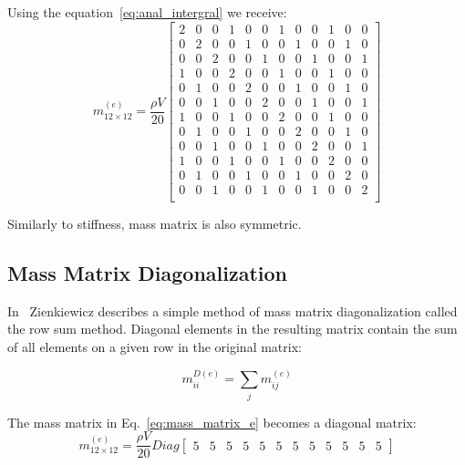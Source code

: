 \documentclass[en]{minipw} %
\begin{document}
Using the equation~\ref{eq:anal_intergral} we receive:
\begin{equation}
\label{eq:mass_matrix_e}
m^{(e)}_{12 \times 12} = \dfrac{\rho V}{20}
\begin{bmatrix}
2 & 0 & 0 & 1 & 0 & 0 & 1 & 0 & 0 & 1 & 0 & 0 \\
0 & 2 & 0 & 0 & 1 & 0 & 0 & 1 & 0 & 0 & 1 & 0 \\
0 & 0 & 2 & 0 & 0 & 1 & 0 & 0 & 1 & 0 & 0 & 1 \\
1 & 0 & 0 & 2 & 0 & 0 & 1 & 0 & 0 & 1 & 0 & 0 \\
0 & 1 & 0 & 0 & 2 & 0 & 0 & 1 & 0 & 0 & 1 & 0 \\
0 & 0 & 1 & 0 & 0 & 2 & 0 & 0 & 1 & 0 & 0 & 1 \\
1 & 0 & 0 & 1 & 0 & 0 & 2 & 0 & 0 & 1 & 0 & 0 \\
0 & 1 & 0 & 0 & 1 & 0 & 0 & 2 & 0 & 0 & 1 & 0 \\
0 & 0 & 1 & 0 & 0 & 1 & 0 & 0 & 2 & 0 & 0 & 1 \\
1 & 0 & 0 & 1 & 0 & 0 & 1 & 0 & 0 & 2 & 0 & 0 \\
0 & 1 & 0 & 0 & 1 & 0 & 0 & 1 & 0 & 0 & 2 & 0 \\
0 & 0 & 1 & 0 & 0 & 1 & 0 & 0 & 1 & 0 & 0 & 2 \\
\end{bmatrix}
\end{equation}

Similarly to stiffness, mass matrix is also symmetric.

\subsection{Mass Matrix Diagonalization}
In~\cite{zienkiewicz2} Zienkiewicz describes a simple method of mass matrix diagonalization called the row sum method. Diagonal elements in the resulting matrix contain the sum of all elements on a given row in the original matrix:

\begin{equation}
m^{D(e)}_{ii} = \sum_{j} m^{(e)}_{ij}
\end{equation}

The mass matrix in Eq.~\ref{eq:mass_matrix_e} becomes a diagonal matrix:
\begin{equation}
\label{eq:mass_matrix_e}
m^{(e)}_{12 \times 12} = \dfrac{\rho V}{20}
Diag
\begin{bmatrix}
5 & 5 & 5 & 5 & 5 & 5 & 5 & 5 & 5 & 5 & 5 & 5
\end{bmatrix}
\end{equation}
\end{document}
